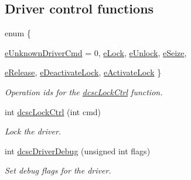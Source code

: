 \subsection*{Driver control functions}
\begin{CompactItemize}
\item 
enum \{ \par
\hyperlink{group__dcsc__msg__buffer__access_ggbed82baf7f470b522273a3e37c24c600da3c950575dcbbc7ca50d76a111d217d}{e\-Unknown\-Driver\-Cmd} = 0, 
\hyperlink{group__dcsc__msg__buffer__access_ggbed82baf7f470b522273a3e37c24c600c0b7933997697a647dbfb83d828142f3}{e\-Lock}, 
\hyperlink{group__dcsc__msg__buffer__access_ggbed82baf7f470b522273a3e37c24c600fc021c4ba87bb9763ec7f4e07855d8f9}{e\-Unlock}, 
\hyperlink{group__dcsc__msg__buffer__access_ggbed82baf7f470b522273a3e37c24c6001391714f3c5c8e7738e9b0e871dc3cce}{e\-Seize}, 
\par
\hyperlink{group__dcsc__msg__buffer__access_ggbed82baf7f470b522273a3e37c24c6001349887513e044eb25dceda6bc2c9429}{e\-Release}, 
\hyperlink{group__dcsc__msg__buffer__access_ggbed82baf7f470b522273a3e37c24c600be8853084b74223aab7a0a0c8150eb5a}{e\-Deactivate\-Lock}, 
\hyperlink{group__dcsc__msg__buffer__access_ggbed82baf7f470b522273a3e37c24c60052e15b8bac21d0241661e3caf289e745}{e\-Activate\-Lock}
 \}
\begin{CompactList}\small\item\em Operation ids for the \hyperlink{group__dcsc__msg__buffer__access_gb01774a452cb68f631a87d2d77ac79a5}{dcsc\-Lock\-Ctrl} function. \item\end{CompactList}\item 
int \hyperlink{group__dcsc__msg__buffer__access_gb01774a452cb68f631a87d2d77ac79a5}{dcsc\-Lock\-Ctrl} (int cmd)
\begin{CompactList}\small\item\em Lock the driver. \item\end{CompactList}\item 
int \hyperlink{group__dcsc__msg__buffer__access_g8dc96e96fb45e86a27c98fbe8d816edf}{dcsc\-Driver\-Debug} (unsigned int flags)
\begin{CompactList}\small\item\em Set debug flags for the driver. \item\end{CompactList}\end{CompactItemize}
